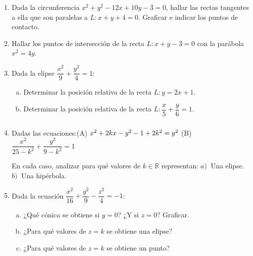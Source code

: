 \documentclass[11pt]{article}
\begin{document}
\begin{enumerate}[\hspace{-5mm}$1)$]
\item Dada la circunferencia $x^2 + y^2 - 12x + 10y - 3 = 0$, hallar las rectas tangentes a ella que son paralelas a $L: x + y + 4 = 0$. Graficar e indicar los puntos de contacto.











\item Hallar los puntos de intersección de la recta $L: x + y - 3 = 0$ con la parábola $x^2 = 4y$.














\item Dada la elipse $\dfrac{x^2}{9} + \dfrac{y^2}{4} = 1$:
\begin{enumerate}[a)]
\item Determinar la posición relativa de la recta $L: y = 2x + 1$.
\item Determinar la posición relativa de la recta $L: \dfrac{x}{5} + \dfrac{y}{6} = 1$.
\end{enumerate}







\item Dadas las ecuaciones:\qquad\qquad (A) $x^2 + 2kx - y^2 - 1 + 2k^2 = y^2 \rule{0mm}{6mm}$ \qquad (B) $\dfrac{x^2}{25 - k^2} + \dfrac{y^2}{9 - k^2} = 1$    

En cada caso, analizar para qué valores de $k \in \mathbb{R}$ representan:
\quad$a)\ $ Una elipse. \qquad
$b)\ $ Una hipérbola.







\item Dada la ecuación $\dfrac{x^2}{16} + \dfrac{y^2}{9} - \dfrac{z^2}{4} = -1$:
\begin{enumerate}[a)]
\item ¿Qué cónica se obtiene si $y = 0$? ¿Y si $z = 0$? Graficar.
\item ¿Para qué valores de $z = k$ se obtiene una elipse?
\item ¿Para qué valores de $z = k$ se obtiene un punto?
\end{enumerate}







\end{enumerate}
\end{document}
